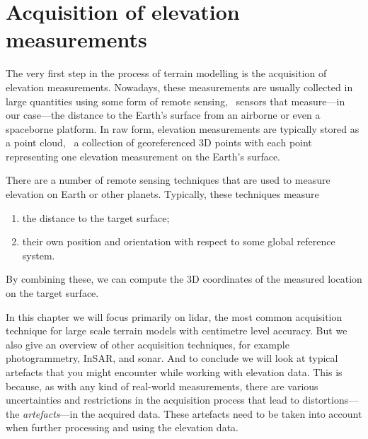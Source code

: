 


\graphicspath{{acquisition/}}


\chapter{Acquisition of elevation measurements}%
\label{chap:acquisition}

The very first step in the process of terrain modelling is the acquisition of elevation measurements. 
Nowadays, these measurements are usually collected in large quantities using some form of remote sensing, \ie\ sensors that measure---in our case---the distance to the Earth's surface from an airborne or even a spaceborne platform. 
In raw form, elevation measurements are typically stored as a point cloud, \ie\ a collection of georeferenced 3D points with each point representing one elevation measurement on the Earth's surface.

There are a number of remote sensing techniques that are used to measure elevation on Earth or other planets. 
Typically, these techniques measure
\begin{enumerate}
	\item the distance to the target surface; 
	\item their own position and orientation with respect to some global reference system. 
\end{enumerate}
By combining these, we can compute the 3D coordinates of the measured location on the target surface. 

In this chapter we will focus primarily on lidar, the most common acquisition technique for large scale terrain models with centimetre level accuracy. 
But we also give an overview of other acquisition techniques, for example photogrammetry, InSAR, and sonar. 
And to conclude we will look at typical artefacts that you might encounter while working with elevation data. 
This is because, as with any kind of real-world measurements, there are various uncertainties and restrictions in the acquisition process that lead to distortions---the \emph{artefacts}---in the acquired data. These artefacts need to be taken into account when further processing and using the elevation data. 

